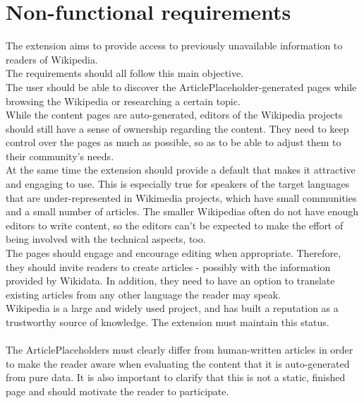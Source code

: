 \chapter{Non-functional requirements}

The extension aims to provide access to previously unavailable information to readers of Wikipedia. \\
The requirements should all follow this main objective. \\
The user should be able to discover the ArticlePlaceholder-generated pages while browsing the Wikipedia or researching a certain topic. \\
While the content pages are auto-generated, editors of the Wikipedia projects should still have a sense of ownership regarding the content. They need to keep control over the pages as much as possible, so as to be able to adjust them to their community's needs. \\
At the same time the extension should provide a default that makes it attractive and engaging to use. This is especially true for speakers of the target languages that are under-represented in Wikimedia projects, which have small communities and a small number of articles. The smaller Wikipedias often do not have enough editors to write content, so the editors can't be expected to make the effort of being involved with the technical aspects, too.  \\
The pages should engage and encourage editing when appropriate. Therefore, they should invite readers to create articles - possibly with the information provided by Wikidata. In addition, they need to have an option to translate existing articles from any other language the reader may speak. \\
Wikipedia is a large and widely used project, and has built a reputation as a trustworthy source of knowledge. The extension must maintain this status. \\
\\
The ArticlePlaceholders must clearly differ from human-written articles in order to make the reader aware when evaluating the content that it is auto-generated from pure data. It is also important to clarify that this is not a static, finished page and should motivate the reader to participate.
